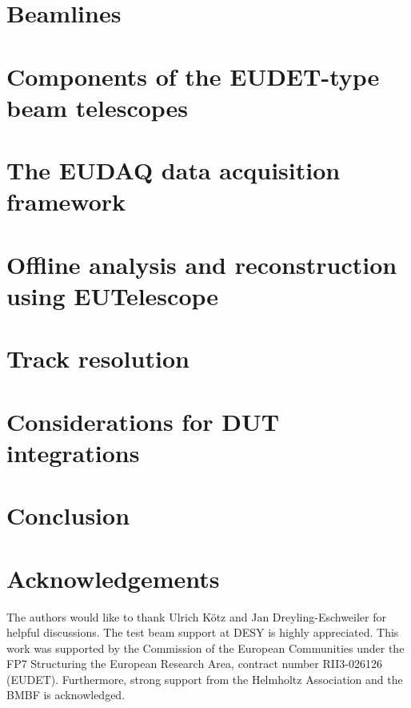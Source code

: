 \documentclass[a4paper,10pt]{article}
\begin{document}
\section{Beamlines}
\label{sec:beamlines}


\section{Components of the EUDET-type beam telescopes}
\label{sec:tscope}


\section{The EUDAQ data acquisition framework}
\label{sec:eudaq}


\section{Offline analysis and reconstruction using EUTelescope}
\label{sec:offline}


\section{Track resolution}
\label{sec:trackres}


\section{Considerations for DUT integrations}
\label{sec:dutintegration}


\section{Conclusion}
\label{sec:conclusion}



\section*{Acknowledgements}
The authors would like to thank Ulrich K\"otz and Jan Dreyling-Eschweiler for helpful discussions. 
The test beam support at DESY is highly appreciated. 
This work was supported by the Commission of the European Communities under the FP7 Structuring the European Research Area, contract number RII3-026126 (EUDET). 
Furthermore, strong support from the Helmholtz Association and the BMBF is acknowledged.

\small


\end{document}
